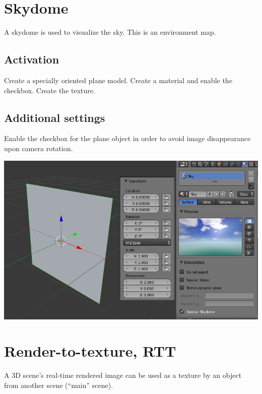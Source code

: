 \documentclass[a4paper,12pt,oneside]{sphinxmanual}
\begin{document}
\section{Skydome}
\label{textures:skydome}\label{textures:skydome-texture}\label{textures:index-12}
A skydome is used to visualize the sky. This is an environment map.


\subsection{Activation}
\label{textures:id22}
Create a specially oriented plane model. Create a material and enable the  checkbox. Create the  texture.


\subsection{Additional settings}
\label{textures:id23}
Enable the  checkbox for the plane object in order to avoid image disappearance upon camera rotation.

{\hfill\includegraphics[width=1.000\linewidth]{skydome.jpg}\hfill}

\begin{DUlineblock}{0em}
\item[] 
\end{DUlineblock}
\label{textures:render-to-texture}

\section{Render-to-texture, RTT}
\label{textures:render-to-texture-rtt}\label{textures:index-13}
A 3D scene's real-time rendered image can be used as a texture by an object from another scene (``main'' scene).
\end{document}

